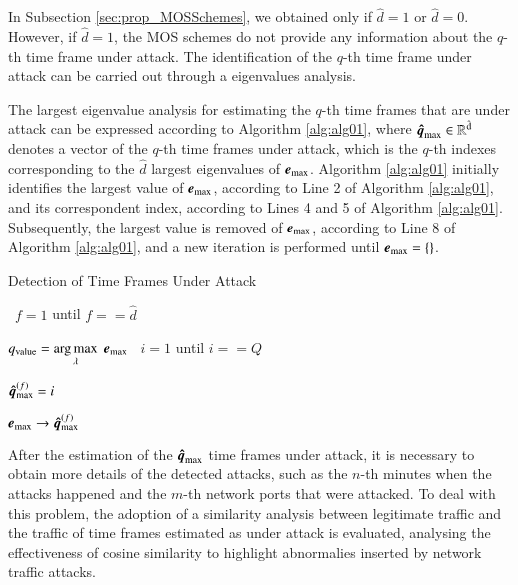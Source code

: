 \documentclass[review]{elsarticle}
\makeatletter
\DeclareMathOperator*{\argmax}{arg\,max}
\newcommand{\ALOOP}[1]{\ALC@it\algorithmicloop\ #1%
  \begin{ALC@loop}}
\newcommand{\ENDALOOP}{\end{ALC@loop}\ALC@it\algorithmicendloop}
\makeatother
\begin{document}
In Subsection \ref{sec:prop_MOSSchemes}, we obtained only if $\hat{d} = 1$ or $\hat{d} = 0$. However, if $\hat{d} = 1$, the MOS schemes do not provide any information about the $q$-th time frame under attack. The identification of the $q$-th time frame under attack can be carried out through a eigenvalues analysis.

The largest eigenvalue analysis for estimating the $q$-th time frames that are under attack can be expressed according to Algorithm \ref{alg:alg01}, where $\rm{\boldsymbol{\hat{q}}}_{\rm max} \in \mathbb{R}^{\hat{d}}$ denotes a vector of the $q$-th time frames under attack, which is the $q$-th indexes corresponding to the $\hat{d}$ largest eigenvalues of $\boldsymbol{e}_{\rm max}$. Algorithm \ref{alg:alg01} initially identifies the largest value of $\boldsymbol{e}_{\rm max}$, according to Line 2 of Algorithm \ref{alg:alg01}, and its correspondent index, according to Lines 4 and 5 of Algorithm \ref{alg:alg01}. Subsequently, the largest value is removed of $\boldsymbol{e}_{\rm max}$, according to Line 8 of Algorithm \ref{alg:alg01}, and a new iteration is performed until $\boldsymbol{e}_{\rm max} = \{\}$.

\begin{algorithm}[h!]
	\caption{Detection of Time Frames Under Attack}
  	\label{alg:alg01}
	\begin{algorithmic}[1]
		\show\LOOP
	    \ALOOP {$f = 1$ until $f == \hat{d}$} 
	    	    \STATE $q_{\rm value} = \argmax\limits_{\lambda}  \hspace{1 mm} \boldsymbol{e}_{\rm max}$
    	    	    \ALOOP {$i = 1$ until $i == Q$} 
				    \STATE $\boldsymbol{\hat{q}}_{\rm max}^{(f)} = i$
				\ENDIF
        		\ENDALOOP
	    		\STATE $\boldsymbol{e}_{\rm max} \rightarrow \boldsymbol{\hat{q}}_{\rm max}^{(f)}$
    		\ENDALOOP
	\end{algorithmic}
\end{algorithm}

After the estimation of the $\rm{\boldsymbol{\hat{q}}}_{\rm max}$ time frames under attack, it is necessary to obtain more details of the detected attacks, such as the $n$-th minutes when the attacks happened and the $m$-th network ports that were attacked. To deal with this problem, the adoption of a similarity analysis between legitimate traffic and the traffic of time frames estimated as under attack is evaluated, analysing the effectiveness of cosine similarity to highlight abnormalies inserted by network traffic attacks. 
\end{document}
